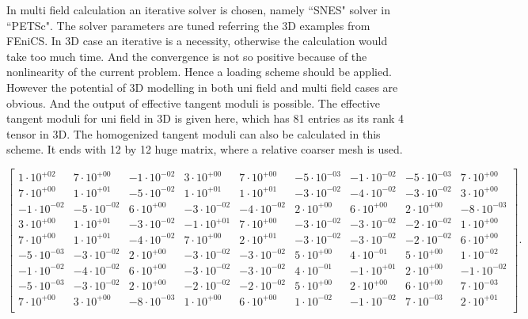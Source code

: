 \documentclass[10pt,a4paper]{scrreprt}
\begin{document}
In multi field calculation an iterative solver is chosen, namely ``SNES" solver in ``PETSc". The solver parameters are tuned referring the 3D examples from FEniCS. In 3D case an iterative is a necessity, otherwise the calculation would take too much time. And the convergence is not so positive because of the nonlinearity of the current problem. Hence a loading scheme should be applied. However the potential of 3D modelling in both uni field and multi field cases are obvious. And the output of effective tangent moduli is possible. The effective tangent moduli for uni field in 3D is given here, which has 81 entries as its rank 4 tensor in 3D. The homogenized tangent moduli can also be calculated in this scheme. It ends with 12 by 12 huge matrix, where a relative coarser mesh is used.
\begin{center}
\[
\begin{bmatrix}
1 \cdot 10^{+02} & 7 \cdot 10^{+00} & -1 \cdot 10^{-02} & 3 \cdot 10^{+00} & 7 \cdot 10^{+00} & -5 \cdot 10^{-03} & -1 \cdot 10^{-02} & -5 \cdot 10^{-03} & 7 \cdot 10^{+00}\\ 
7 \cdot 10^{+00} & 1 \cdot 10^{+01} & -5 \cdot 10^{-02} & 1 \cdot 10^{+01} & 1 \cdot 10^{+01} & -3 \cdot 10^{-02} & -4 \cdot 10^{-02} & -3 \cdot 10^{-02} & 3 \cdot 10^{+00}\\ 
-1 \cdot 10^{-02} & -5 \cdot 10^{-02} & 6 \cdot 10^{+00} & -3 \cdot 10^{-02} & -4 \cdot 10^{-02} & 2 \cdot 10^{+00} & 6 \cdot 10^{+00} & 2 \cdot 10^{+00} & -8 \cdot 10^{-03}\\ 
3 \cdot 10^{+00} & 1 \cdot 10^{+01} & -3 \cdot 10^{-02} & -1 \cdot 10^{+01} & 7 \cdot 10^{+00} & -3 \cdot 10^{-02} & -3 \cdot 10^{-02} & -2 \cdot 10^{-02} & 1 \cdot 10^{+00}\\ 
7 \cdot 10^{+00} & 1 \cdot 10^{+01} & -4 \cdot 10^{-02} & 7 \cdot 10^{+00} & 2 \cdot 10^{+01} & -3 \cdot 10^{-02} & -3 \cdot 10^{-02} & -2 \cdot 10^{-02} & 6 \cdot 10^{+00}\\ 
-5 \cdot 10^{-03} & -3 \cdot 10^{-02} & 2 \cdot 10^{+00} & -3 \cdot 10^{-02} & -3 \cdot 10^{-02} & 5 \cdot 10^{+00} & 4 \cdot 10^{-01} & 5 \cdot 10^{+00} & 1 \cdot 10^{-02}\\ 
-1 \cdot 10^{-02} & -4 \cdot 10^{-02} & 6 \cdot 10^{+00} & -3 \cdot 10^{-02} & -3 \cdot 10^{-02} & 4 \cdot 10^{-01} & -1 \cdot 10^{+01} & 2 \cdot 10^{+00} & -1 \cdot 10^{-02}\\ 
-5 \cdot 10^{-03} & -3 \cdot 10^{-02} & 2 \cdot 10^{+00} & -2 \cdot 10^{-02} & -2 \cdot 10^{-02} & 5 \cdot 10^{+00} & 2 \cdot 10^{+00} & 6 \cdot 10^{+00} & 7 \cdot 10^{-03}\\ 
7 \cdot 10^{+00} & 3 \cdot 10^{+00} & -8 \cdot 10^{-03} & 1 \cdot 10^{+00} & 6 \cdot 10^{+00} & 1 \cdot 10^{-02} & -1 \cdot 10^{-02} & 7 \cdot 10^{-03} & 2 \cdot 10^{+01}\\ 
\end{bmatrix}.
\]

\end{center}
\end{document}
